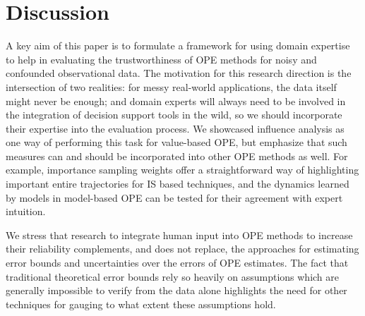 \documentclass{article}
\begin{document}
\section{Discussion}

A key aim of this paper is to formulate a framework for using domain expertise to help in evaluating the trustworthiness of OPE methods for noisy and confounded observational data. The motivation for this research direction is the intersection of two realities: for messy real-world applications, the data itself might never be enough; and domain experts will always need to be involved in the integration of decision support tools in the wild, so we should incorporate their expertise into the evaluation process. We showcased influence analysis as one way of performing this task for value-based OPE, but emphasize that such measures can and should be incorporated into other OPE methods as well. For example, importance sampling weights offer a straightforward way of highlighting important entire trajectories for IS based techniques, and the dynamics learned by models in model-based OPE can be tested for their agreement with expert intuition.

We stress that research to integrate human input into OPE methods to increase their reliability complements, and does not replace, the approaches for estimating error bounds and uncertainties over the errors of OPE estimates. The fact that traditional theoretical error bounds rely so heavily on assumptions which are generally impossible to verify from the data alone highlights the need for other techniques for gauging to what extent these assumptions hold.



\end{document}
